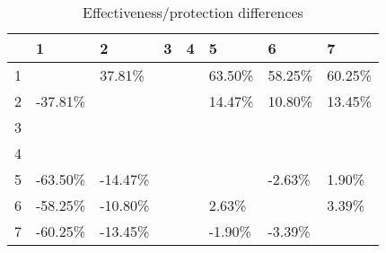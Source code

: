 \begin{table}[ht]
\centering
\begin{tabular}{rlllllll}
  \hline
 & 1 & 2 & 3 & 4 & 5 & 6 & 7 \\ 
  \hline
1 &  & 37.81\% &  &  & 63.50\% & 58.25\% & 60.25\% \\ 
  2 & -37.81\% &  &  &  & 14.47\% & 10.80\% & 13.45\% \\ 
  3 &  &  &  &  &  &  &  \\ 
  4 &  &  &  &  &  &  &  \\ 
  5 & -63.50\% & -14.47\% &  &  &  & -2.63\% & 1.90\% \\ 
  6 & -58.25\% & -10.80\% &  &  & 2.63\% &  & 3.39\% \\ 
  7 & -60.25\% & -13.45\% &  &  & -1.90\% & -3.39\% &  \\ 
   \hline
\end{tabular}
\caption{Effectiveness/protection differences} 
\end{table}
